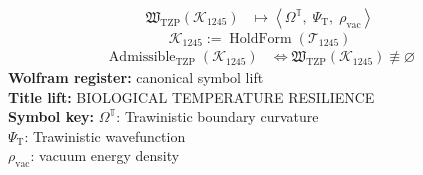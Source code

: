 \noindent
\begin{minipage}[t]{0.48\linewidth}
\begingroup
\small
\[
\begin{aligned}
\mathfrak{W}_{\mathrm{TZP}}\!\left(\mathcal{K}_{1245}\right)
&\longmapsto
\left\langle \Omega^{\mathbb{T}},\; \Psi_{\mathrm{T}},\; \rho_{\mathrm{vac}} \right\rangle
\end{aligned}
\]
\[
\mathcal{K}_{1245}
:=
\operatorname{HoldForm}\!\left(\mathcal{T}_{1245}\right)
\]
\[
\begin{aligned}
\operatorname{Admissible}_{\mathrm{TZP}}\!\left(\mathcal{K}_{1245}\right)
&\Longleftrightarrow
\mathfrak{W}_{\mathrm{TZP}}\!\left(\mathcal{K}_{1245}\right)\not\equiv\varnothing
\end{aligned}
\]
\textbf{Wolfram register:} canonical symbol lift\\
\textbf{Title lift:} BIOLOGICAL TEMPERATURE RESILIENCE\\
\textbf{Symbol key:} \(\Omega^{\mathbb{T}}\): Trawinistic boundary curvature\\ \(\Psi_{\mathrm{T}}\): Trawinistic wavefunction\\ \(\rho_{\mathrm{vac}}\): vacuum energy density
\par
\endgroup
\end{minipage}\hfill
